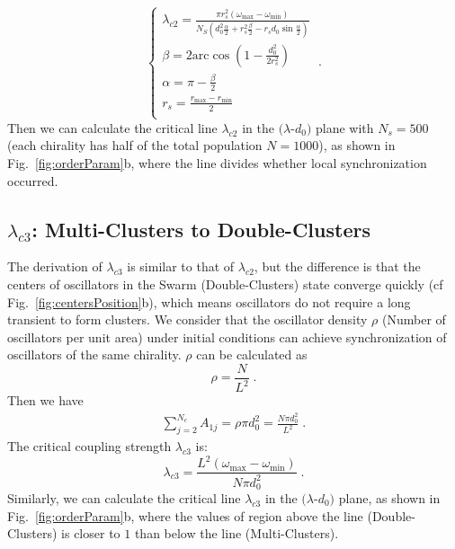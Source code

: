 \documentclass[%
 aip,
 amsmath,amssymb,
 reprint,%
]{revtex4-1}
\begin{document}
\begin{equation}
    \begin{cases}
        \lambda _{c2}=\frac{\pi r_{s}^{2}\left( \omega _{\max}-\omega _{\min} \right)}{N_S\left( d_{0}^{2}\frac{\alpha}{2}+r_{s}^{2}\frac{\beta}{2}-r_sd_0\sin \frac{\alpha}{2} \right)}\\
        \beta =2\mathrm{arc}\cos \left( 1-\frac{d_{0}^{2}}{2r_{s}^{2}} \right)\\
        \alpha =\pi -\frac{\beta}{2}\\
        r_s=\frac{r_{\max}-r_{\min}}{2}\\
    \end{cases}\;.
\end{equation}
Then we can calculate the critical line $\lambda_{c2}$ in the $(\lambda$-$d_0)$ plane with $N_s=500$ (each chirality has half of the total population $N=1000$), as shown in Fig.~\ref{fig:orderParam}b, where the line divides whether local synchronization occurred.

\subsection{$\lambda_{c3}$: Multi-Clusters to Double-Clusters}

The derivation of $\lambda_{c3}$ is similar to that of $\lambda_{c2}$, but the difference is that the centers of oscillators in the Swarm (Double-Clusters) state converge quickly (cf Fig.~\ref{fig:centersPosition}b), which means oscillators do not require a long transient to form clusters. We consider that the oscillator density $\rho$ (Number of oscillators per unit area) under initial conditions can achieve synchronization of oscillators of the same chirality. $\rho$ can be calculated as 
\begin{equation}
    \rho =\frac{N}{L^2}\;.
\end{equation}
Then we have 
\begin{eqnarray}
    \sum_{j=2}^{N_c}{A_{1j}}=\rho \pi d_{0}^{2}=\frac{N\pi d_{0}^{2}}{L^2}\;.
\end{eqnarray}
The critical coupling strength $\lambda_{c3}$ is:
\begin{equation}
    \lambda _{c3}=\frac{L^2\left( \omega _{\max}-\omega _{\min} \right)}{N\pi d_{0}^{2}}\;.
\end{equation}
Similarly, we can calculate the critical line $\lambda_{c3}$ in the $(\lambda$-$d_0)$ plane, as shown in Fig.~\ref{fig:orderParam}b, where the values of region above the line (Double-Clusters) is closer to $1$ than below the line (Multi-Clusters).
\end{document}
